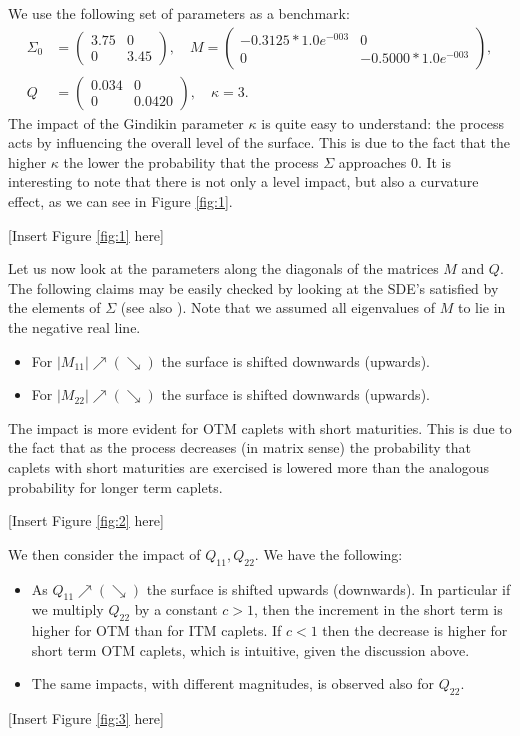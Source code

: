 We use the following set of parameters as a benchmark:
\begin{align}
\Sigma_0&=\left(\begin{array}{cc} 3.75&0\\ 0&3.45\end{array}\right),\quad M=\left(\begin{array}{cc} -0.3125*1.0e^{-003}&0\\ 0& -0.5000*1.0e^{-003} \end{array}\right),\nonumber\\
Q&=\left(\begin{array}{cc} 0.034&0\\ 0&0.0420\end{array}\right),\quad \kappa=3.\nonumber
\end{align}
The impact of the Gindikin parameter $\kappa$ is quite easy to understand: the process acts by influencing the overall level of the surface. This is due to the fact that the higher $\kappa$ the lower the probability that the process $\Sigma$ approaches 0. It is interesting to note that there is not only a level impact, but also a curvature effect, as we can see in Figure \ref{fig:1}.
\begin{center}
[Insert Figure \ref{fig:1} here]
\end{center}
Let us now look at the parameters along the diagonals of the matrices $M$ and $Q$. The following claims may be easily checked by looking at the SDE's satisfied by the elements of $\Sigma$ (see also \cite{article_DaFonseca4}). Note that we assumed all eigenvalues of $M$ to lie in the negative real line.
\begin{itemize}
\item For $\left|M_{11}\right|\nearrow(\searrow)$ the surface is shifted downwards (upwards).
\item For $\left|M_{22}\right|\nearrow(\searrow)$ the surface is shifted downwards (upwards).
\end{itemize}
The impact is more evident for OTM caplets with short maturities. This is due to the fact that as the process decreases (in matrix sense) the probability that caplets with short maturities are exercised is lowered more than the analogous probability for longer term caplets.
\begin{center}
[Insert Figure \ref{fig:2}  here]
\end{center}
We then consider the impact of $Q_{11},Q_{22}$. We have the following:
\begin{itemize}
\item As $Q_{11}\nearrow(\searrow)$ the surface is shifted upwards (downwards). In particular if we multiply $Q_{22}$ by a constant $c>1$, then the increment in the short term is higher for OTM than for ITM caplets. If $c<1$ then the decrease is higher for short term OTM caplets, which is intuitive, given the discussion above.
\item The same impacts, with different magnitudes, is observed also for $Q_{22}$.
\end{itemize}
\begin{center}
[Insert Figure \ref{fig:3}  here]
\end{center}


